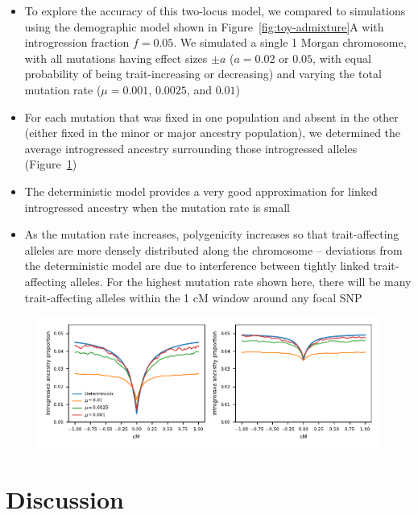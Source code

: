\documentclass{article}
\begin{document}
\begin{itemize}
    \item To explore the accuracy of this two-locus model, we compared to
        simulations using the demographic model shown in
        Figure~\ref{fig:toy-admixture}A with introgression fraction $f=0.05$.
        We simulated a single 1 Morgan
        chromosome, with all mutations having effect sizes $\pm a$ ($a=0.02$ or
        $0.05$, with equal probability of being trait-increasing or decreasing)
        and varying the total mutation rate ($\mu=0.001$, $0.0025$, and $0.01$)
    \item For each mutation that was fixed in one population and absent in the
        other (either fixed in the minor or major ancestry population), we
        determined the average introgressed ancestry surrounding those introgressed
        alleles (Figure~\ref{fig:linkage-sim})
    \item The deterministic model provides a very good approximation for linked
        introgressed ancestry when the mutation rate is small
    \item As the mutation rate increases, polygenicity increases so that
        trait-affecting alleles are more densely distributed along the chromosome --
        deviations from the deterministic model are due to interference between
        tightly linked trait-affecting alleles. For the highest mutation rate shown
        here, there will be many trait-affecting alleles within the 1 cM window
        around any focal SNP
\end{itemize}

\begin{figure}[t!]
    \centering
    \includegraphics{../figures/linkage_simulation.pdf}
    \caption{
        \textbf{}
    }
    \label{fig:linkage-sim}
\end{figure}


\section*{Discussion}
\end{document}
